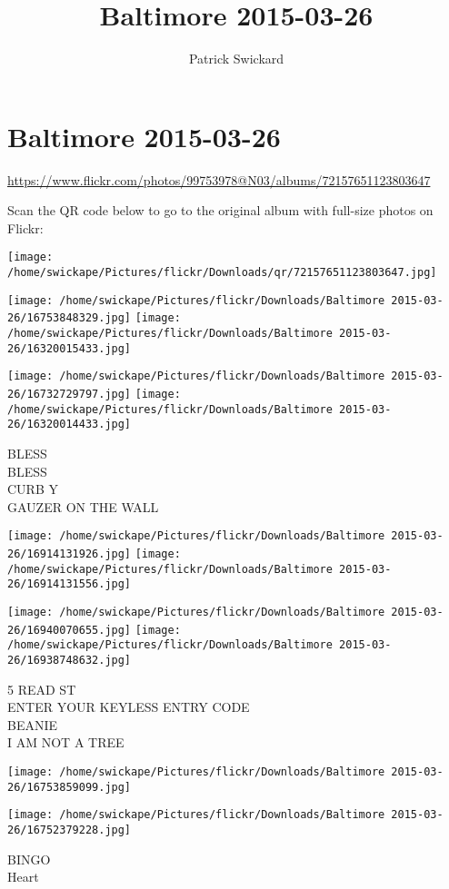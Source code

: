 \documentclass[10pt,letterpaper]{article}
\title{Baltimore 2015-03-26}
\author{Patrick Swickard}
\date{}
\begin{document}
\section*{Baltimore 2015-03-26}

\url{https://www.flickr.com/photos/99753978@N03/albums/72157651123803647}

Scan the QR code below to go to the original album with full-size photos on Flickr:

\texttt{[image: /home/swickape/Pictures/flickr/Downloads/qr/72157651123803647.jpg]}
\pagebreak

\texttt{[image: /home/swickape/Pictures/flickr/Downloads/Baltimore 2015-03-26/16753848329.jpg]}
\texttt{[image: /home/swickape/Pictures/flickr/Downloads/Baltimore 2015-03-26/16320015433.jpg]}

\texttt{[image: /home/swickape/Pictures/flickr/Downloads/Baltimore 2015-03-26/16732729797.jpg]}
\texttt{[image: /home/swickape/Pictures/flickr/Downloads/Baltimore 2015-03-26/16320014433.jpg]}

BLESS\\
BLESS\\
CURB Y\\
GAUZER ON THE WALL
\pagebreak

\texttt{[image: /home/swickape/Pictures/flickr/Downloads/Baltimore 2015-03-26/16914131926.jpg]}
\texttt{[image: /home/swickape/Pictures/flickr/Downloads/Baltimore 2015-03-26/16914131556.jpg]}

\texttt{[image: /home/swickape/Pictures/flickr/Downloads/Baltimore 2015-03-26/16940070655.jpg]}
\texttt{[image: /home/swickape/Pictures/flickr/Downloads/Baltimore 2015-03-26/16938748632.jpg]}

5 READ ST\\
ENTER YOUR KEYLESS ENTRY CODE\\
BEANIE\\
I AM NOT A TREE
\pagebreak

\texttt{[image: /home/swickape/Pictures/flickr/Downloads/Baltimore 2015-03-26/16753859099.jpg]}

\vspace{0.25in}
\texttt{[image: /home/swickape/Pictures/flickr/Downloads/Baltimore 2015-03-26/16752379228.jpg]}

BINGO\\
Heart
\pagebreak
\end{document}
